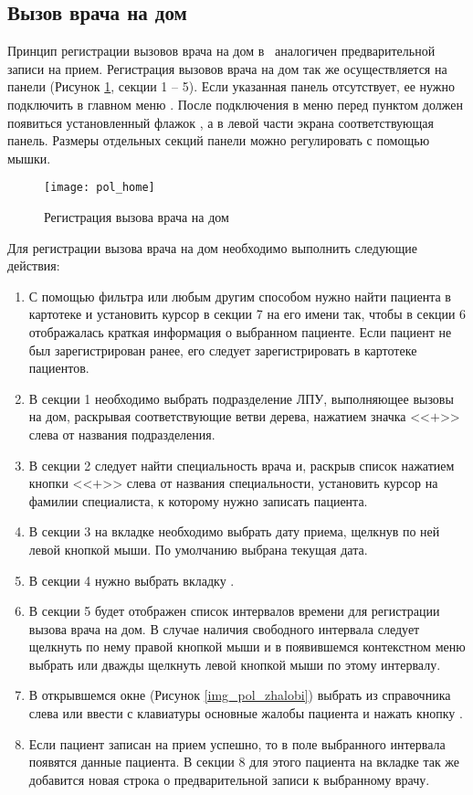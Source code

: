 \subsection{Вызов врача на дом} \label{pol_home}

Принцип регистрации вызовов врача на дом в \tmis~аналогичен предварительной записи на прием. Регистрация вызовов врача на дом так же осуществляется на панели  (Рисунок \ref{img_pol_home}, секции 1 – 5). Если указанная панель отсутствует, ее нужно подключить в главном меню . После подключения в меню перед пунктом  должен появиться установленный флажок \putx , а в левой части экрана соответствующая панель. Размеры отдельных секций панели можно регулировать с помощью мышки.

\begin{figure}[ht]\centering
 \texttt{[image: pol\_home]}
 \caption{Регистрация вызова врача на дом}
 \label{img_pol_home}
\end{figure}

Для регистрации вызова врача на дом необходимо выполнить следующие действия:
\begin{enumerate}
 \item С помощью фильтра или любым другим способом нужно найти пациента в картотеке и установить курсор в секции 7 на его имени так, чтобы в секции 6 отображалась краткая информация о выбранном пациенте. Если пациент не был зарегистрирован ранее, его следует зарегистрировать в картотеке пациентов.
 \item В секции 1 необходимо выбрать подразделение ЛПУ, выполняющее вызовы на дом, раскрывая соответствующие ветви дерева, нажатием значка <<$+$>> слева от названия подразделения.
 \item В секции 2 следует найти специальность врача и, раскрыв список нажатием кнопки <<$+$>> слева от названия специальности, установить курсор на фамилии специалиста, к которому нужно записать пациента.
 \item В секции 3 на вкладке  необходимо выбрать дату приема, щелкнув по ней левой кнопкой мыши. По умолчанию выбрана текущая дата.
 \item В секции 4 нужно выбрать вкладку .
 \item В секции 5 будет отображен список интервалов времени для регистрации вызова врача на дом. В случае наличия свободного интервала следует щелкнуть по нему правой кнопкой мыши и в появившемся контекстном меню выбрать  или дважды щелкнуть левой кнопкой мыши по этому интервалу.
 \item В открывшемся окне (Рисунок \ref{img_pol_zhalobi}) выбрать из справочника слева или ввести с клавиатуры основные жалобы пациента и нажать кнопку .
 \item Если пациент записан на прием успешно, то в поле  выбранного интервала появятся данные пациента. В секции 8 для этого пациента на вкладке  так же добавится новая строка о предварительной записи к выбранному врачу.
\end{enumerate}

